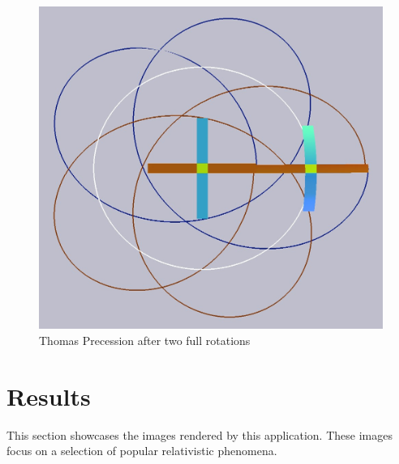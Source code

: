 \documentclass{egpubl}
\begin{document}
\begin{figure}[htb]
  	\centering
	\includegraphics[width=.95\linewidth]{figures/v06_r20_2rot_path.jpg}
	\caption{Thomas Precession after two full rotations}
	\label{fig:thomasPrec_02}
\end{figure}

\section{Results}
\label{sec:results}
This section showcases the images rendered by this application. These images focus on a selection of popular relativistic phenomena.
\end{document}
